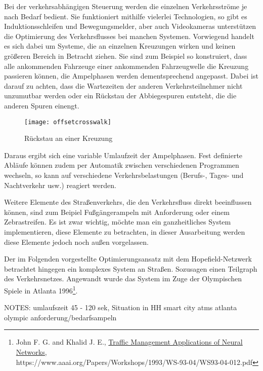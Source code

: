 Bei der verkehrsabhängigen Steuerung werden die einzelnen Verkehrsströme je nach Bedarf bedient. Sie funktioniert mithilfe vielerlei Technologien, so gibt es Induktionsschleifen und Bewegungsmelder, aber auch Videokameras unterstützen die Optimierung des Verkehrsflusses bei manchen Systemen. Vorwiegend handelt es sich dabei um Systeme, die an einzelnen Kreuzungen wirken und keinen größeren Bereich in Betracht ziehen. Sie sind zum Beispiel so konstruiert, dass alle ankommenden Fahrzeuge einer ankommenden Fahrzeugwelle die Kreuzung passieren können, die Ampelphasen werden dementsprechend angepasst. Dabei ist darauf zu achten, dass die Wartezeiten der anderen Verkehrsteilnehmer nicht unzumutbar werden oder ein Rückstau der Abbiegespuren entsteht, die die anderen Spuren einengt.

\begin{figure}[H]
    \centering
    \texttt{[image: offsetcrosswalk]}
    \caption{Rückstau an einer Kreuzung}
    \label{fig:rueckstau}
\end{figure}

Daraus ergibt sich eine variable Umlaufzeit der Ampelphasen. Fest definierte Abläufe können zudem per Automatik zwischen verschiedenen Programmen wechseln, so kann auf verschiedene Verkehrsbelastungen (Berufs-, Tages- und Nachtverkehr usw.) reagiert werden.

Weitere Elemente des Straßenverkehrs, die den Verkehrsfluss direkt beeinflussen können, sind zum Beipiel Fußgängerampeln mit Anforderung oder einem Zebrastreifen. Es ist zwar wichtig, möchte man ein ganzheitliches System implementieren, diese Elemente zu betrachten, in dieser Ausarbeitung werden diese Elemente jedoch noch außen vorgelassen.

Der im Folgenden vorgestellte Optimierungsansatz mit dem Hopefield-Netzwerk betrachtet hingegen ein komplexes System an Straßen. Sozusagen einen Teilgraph des Verkehrsnetzes. Angewandt wurde das System im Zuge der Olympischen Spiele in Atlanta 1996\footnote{John F. G. and Khalid J. E., \href{https://www.aaai.org/Papers/Workshops/1993/WS-93-04/WS93-04-012.pdf}{Traffic Management Applications of Neural Networks,} \\https://www.aaai.org/Papers/Workshops/1993/WS-93-04/WS93-04-012.pdf}.

NOTES:
umlaufszeit 45 - 120 sek, Situation in HH
smart city 
atms
atlanta olympic
anforderung/bedarfsampeln


\newpage

